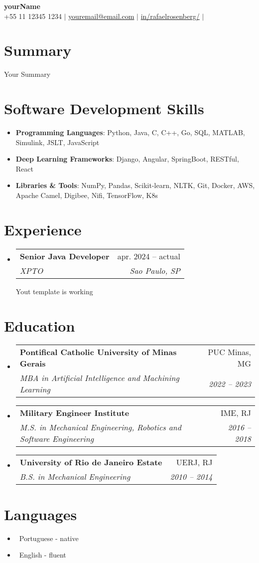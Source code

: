\documentclass[letterpaper,10pt]{article}
\makeatletter
\newcommand{\resumeItem}[1]{\item\small{#1}}
\newcommand{\resumeSubheading}[4]{
\vspace{-1pt}\item
  \begin{tabular*}{0.97\textwidth}[t]{l@{\extracolsep{\fill}}r}
    \textbf{#1} & #2 \\
    \textit{#3} & \textit{#4} \\
  \end{tabular*}\vspace{-7pt}
}
\newcommand{\resumeSubHeadingList}{\begin{itemize}[leftmargin=0.15in, label={}]}
\newcommand{\resumeSubHeadingListEnd}{\end{itemize}}
\makeatother
\begin{document}
\begin{center}
  \textbf{\Huge yourName} \\
  \small +55 11 12345 1234 $|$ \href{mailto:youremail@email.com}{youremail@email.com} $|$ 
  \href{https://www.linkedin.com/in/rafaelrosenberg/}{in/rafaelrosenberg/} $|$
\end{center}

\section*{Summary}
  Your Summary

\section{Software Development Skills}
\resumeSubHeadingList
  \resumeItem{\textbf{Programming Languages}: Python, Java, C, C++, Go, SQL, MATLAB, Simulink, JSLT, JavaScript}
  \resumeItem{\textbf{Deep Learning Frameworks}: Django, Angular, SpringBoot, RESTful, React}
  \resumeItem{\textbf{Libraries \& Tools}: NumPy, Pandas, Scikit-learn, NLTK, Git, Docker, AWS, Apache Camel, Digibee, Nifi, TensorFlow, K8s}
\resumeSubHeadingListEnd

\section{Experience}
\resumeSubHeadingList
  \resumeSubheading
      {Senior Java Developer}{apr. 2024 -- actual}
      {XPTO}{Sao Paulo, SP}
      Yout template is working
\resumeSubHeadingListEnd

\section{Education}
\resumeSubHeadingList
  \resumeSubheading
      {Pontifical Catholic University of Minas Gerais}{PUC Minas, MG}
      {MBA in Artificial Intelligence and Machining Learning}{2022 -- 2023}
  \resumeSubheading
      {Military Engineer Institute}{IME, RJ}
      {M.S. in Mechanical Engineering, Robotics and Software Engineering}{2016 -- 2018}
  \resumeSubheading
      {University of Rio de Janeiro Estate}{UERJ, RJ}
      {B.S. in Mechanical Engineering}{2010 -- 2014}
\resumeSubHeadingListEnd

\section{Languages}
\resumeSubHeadingList
  \resumeItem{\textbullet\ Portuguese - native}
  \resumeItem{\textbullet\ English - fluent}
\resumeSubHeadingListEnd
\end{document}

